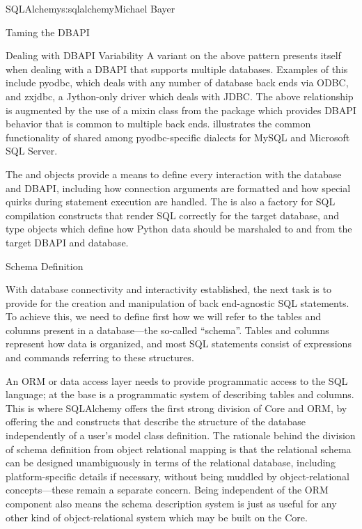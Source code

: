 \begin{aosachapter}{SQLAlchemy}{s:sqlalchemy}{Michael Bayer}
\begin{aosasect1}{Taming the DBAPI}
\begin{aosasect2}{Dealing with DBAPI Variability}
A variant on the above pattern presents itself when dealing with a DBAPI
that supports multiple databases.   Examples of this include
pyodbc, which deals with any number of database back ends via ODBC,
and zxjdbc, a Jython-only driver which deals with JDBC.   The above
relationship is augmented by the use of a mixin class from the
 package which provides DBAPI behavior that
is common to multiple back ends.   illustrates the common
functionality of  shared among
pyodbc-specific dialects for MySQL and Microsoft SQL Server.


The  and  objects provide a means
to define every interaction with the database and DBAPI,
including how connection arguments are formatted and how special
quirks during statement execution are handled. The 
is also a factory for SQL compilation constructs that render
SQL correctly for the target database, and type objects which
define how Python data should be marshaled to and from the target
DBAPI and database.

\end{aosasect2}

\end{aosasect1}

\begin{aosasect1}{Schema Definition}

With database connectivity and interactivity established, the next task
is to provide for the creation and manipulation of back end-agnostic
SQL statements.  To achieve this, we need to define first how we will
refer to the tables and columns present in a database---the so-called
``schema''.  Tables and columns represent how data
is organized, and most SQL statements consist of expressions and
commands referring to these structures.

An ORM or data access layer needs to provide programmatic access to the SQL
language; at the base is a programmatic system of describing tables and
columns. This is where SQLAlchemy offers the first strong division of Core
and ORM, by offering the  and  constructs that describe
the structure of the database independently of a user's model class
definition.  The rationale behind the division of schema definition from object
relational mapping is that the relational schema can be designed
unambiguously in terms of the relational database, including platform-specific
details if necessary, without being muddled by object-relational concepts---these 
remain a separate concern. Being independent of the ORM component also
means the schema description system is just as useful for any other kind of
object-relational system which may be built on the Core.


\end{aosasect1}
\end{aosachapter}
